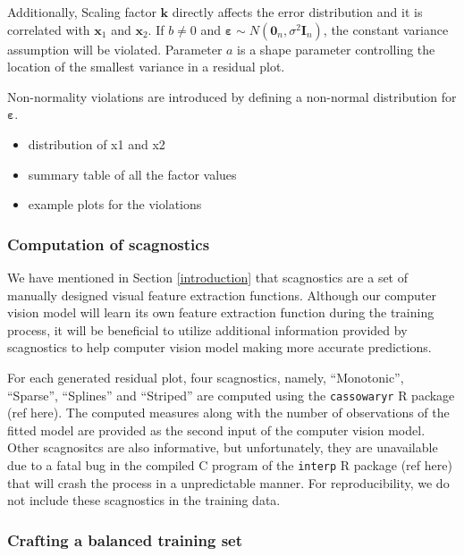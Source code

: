 \documentclass[]{interact}
\theoremstyle{plain}%
\theoremstyle{definition}
\theoremstyle{remark}
\providecommand{\tightlist}{%
  \setlength{\itemsep}{0pt}\setlength{\parskip}{0pt}}
\def\tightlist{}
\begin{document}
Additionally, Scaling factor \(\boldsymbol{k}\) directly affects the
error distribution and it is correlated with \(\boldsymbol{x}_1\) and
\(\boldsymbol{x}_2\). If \(b \neq 0\) and
\(\boldsymbol{\varepsilon} \sim N(\boldsymbol{0}_n, \sigma^2\boldsymbol{I}_n)\),
the constant variance assumption will be violated. Parameter \(a\) is a
shape parameter controlling the location of the smallest variance in a
residual plot.

Non-normality violations are introduced by defining a non-normal
distribution for \(\boldsymbol{\varepsilon}\).

\begin{itemize}
\tightlist
\item
  distribution of x1 and x2
\item
  summary table of all the factor values
\item
  example plots for the violations
\end{itemize}

\hypertarget{computation-of-scagnostics}{%
\subsubsection{Computation of
scagnostics}\label{computation-of-scagnostics}}

We have mentioned in Section \ref{introduction} that scagnostics are a
set of manually designed visual feature extraction functions. Although
our computer vision model will learn its own feature extraction function
during the training process, it will be beneficial to utilize additional
information provided by scagnostics to help computer vision model making
more accurate predictions.

For each generated residual plot, four scagnostics, namely,
``Monotonic'', ``Sparse'', ``Splines'' and ``Striped'' are computed
using the \texttt{cassowaryr} R package (ref here). The computed
measures along with the number of observations of the fitted model are
provided as the second input of the computer vision model. Other
scagnositcs are also informative, but unfortunately, they are
unavailable due to a fatal bug in the compiled C program of the
\texttt{interp} R package (ref here) that will crash the process in a
unpredictable manner. For reproducibility, we do not include these
scagnostics in the training data.

\hypertarget{crafting-a-balanced-training-set}{%
\subsubsection{Crafting a balanced training
set}\label{crafting-a-balanced-training-set}}
\end{document}
